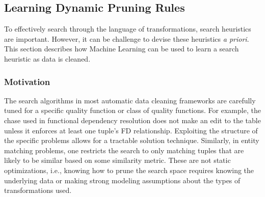 % 
% 







\subsection{Learning Dynamic Pruning Rules}\label{s:dynlearn}
To effectively search through the language of transformations, search heuristics are important.
However, it can be challenge to devise these heuristics \emph{a priori}.
This section describes how Machine Learning can be used to learn a search heuristic as data is cleaned.

\subsubsection{Motivation}
The search algorithms in  most automatic data cleaning frameworks are carefully tuned for a specific quality function or class of quality functions. For example, the chase used in functional dependency resolution does not make an edit to the table unless it enforces at least one tuple's FD relationship. Exploiting the structure of the specific problems allows for a tractable solution technique. Similarly, in entity matching problems, one restricts the search to only matching tuples that are likely to be similar based on some similarity metric.
These are not static optimizations, i.e., knowing how to prune the search space requires knowing the underlying data or making strong modeling assumptions about the types of transformations used.

